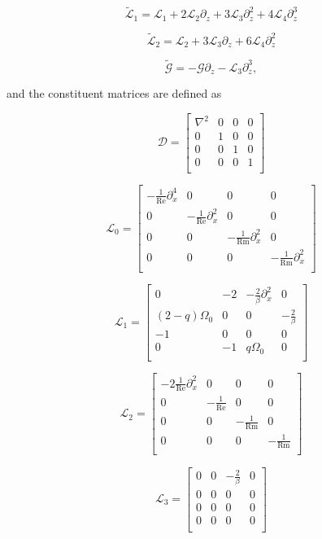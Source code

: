 \documentclass{emulateapj}
\newcommand{\beq}{\begin{equation}}
\newcommand{\eeq}{\end{equation}}
\newcommand\reye{\mathrm{Re}}
\newcommand\reym{\mathrm{Rm}}
\begin{document}
\beq
\widetilde{\mathcal{L}}_1 =  \mathcal{L}_1 + 2\mathcal{L}_2\partial_z + 3\mathcal{L}_3\partial_z^2 + 4\mathcal{L}_4\partial_z^3
\eeq

\beq
\widetilde{\mathcal{L}}_2 = \mathcal{L}_2 + 3\mathcal{L}_3\partial_z + 6\mathcal{L}_4\partial_z^2
\eeq

\beq
\widetilde{\mathcal{G}} = - \mathcal{G} \partial_z - \mathcal{L}_3 \partial_z^3,
\eeq

and the constituent matrices are defined as 

\beq
\mathcal{D} = \left[\begin{matrix}
\nabla^2 & 0 & 0 & 0 \\
0 & 1& 0 & 0 \\
0 & 0 & 1 & 0\\
0 & 0 & 0 & 1 \\
\end{matrix}\right]
\eeq

\beq
\mathcal{L}_0 = \left[\begin{matrix}
-\frac{1}{\reye}\partial_x^4 & 0 & 0 & 0 \\
0 & -\frac{1}{\reye}\partial_x^2 & 0 &0 \\
0 & 0 & -\frac{1}{\reym}\partial_x^2 & 0 \\
0 & 0 & 0 & -\frac{1}{\reym}\partial_x^2 \\ \end{matrix}\right]
\eeq

\beq
\mathcal{L}_1 = \left[\begin{matrix}
0 & -2 & -\frac{2}{\beta}\partial_x^2 & 0 \\
(2-q)\Omega_0 & 0 & 0 & -\frac{2}{\beta} \\
-1 & 0 & 0 & 0 \\
0 & -1 & q\Omega_0 & 0 \\ \end{matrix}\right] 
\eeq

\beq
\mathcal{L}_2 = \left[\begin{matrix}
-2\frac{1}{\reye} \partial_x^2 & 0 & 0 & 0 \\
0 & -\frac{1}{\reye} & 0 & 0 \\
0 & 0 & -\frac{1}{\reym} & 0 \\
0 & 0 & 0 & -\frac{1}{\reym} \\ \end{matrix}\right]
\eeq

\beq
\mathcal{L}_3 = \left[\begin{matrix}
0 & 0 & -\frac{2}{\beta} & 0 \\
0 & 0 & 0 & 0 \\
0 & 0 & 0 & 0 \\
0 & 0 & 0 & 0 \\ \end{matrix} \right]
\eeq
\end{document}
